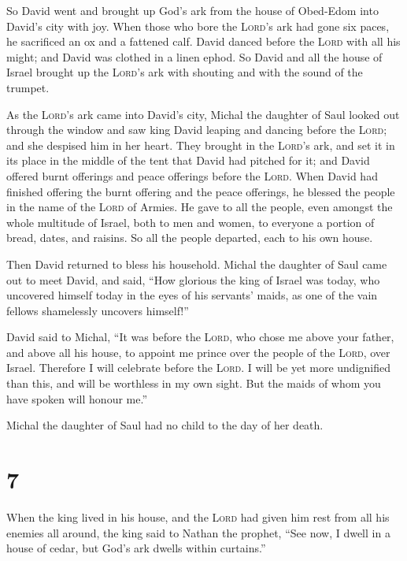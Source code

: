 So David went and brought up God's ark from the house of Obed-Edom into
David's city with joy.  When those who bore the
\textsc{Lord}'s ark had gone six paces, he sacrificed an ox and a
fattened calf.  David danced before the \textsc{Lord}
with all his might; and David was clothed in a linen ephod.
 So David and all the house of Israel brought up the
\textsc{Lord}'s ark with shouting and with the sound of the trumpet.

 As the \textsc{Lord}'s ark came into David's city,
Michal the daughter of Saul looked out through the window and saw king
David leaping and dancing before the \textsc{Lord}; and she despised him
in her heart.  They brought in the \textsc{Lord}'s ark,
and set it in its place in the middle of the tent that David had pitched
for it; and David offered burnt offerings and peace offerings before the
\textsc{Lord}.  When David had finished offering the
burnt offering and the peace offerings, he blessed the people in the
name of the \textsc{Lord} of Armies.  He gave to all the
people, even amongst the whole multitude of Israel, both to men and
women, to everyone a portion of bread, dates, and raisins. So all the
people departed, each to his own house.

 Then David returned to bless his household. Michal the
daughter of Saul came out to meet David, and said, ``How glorious the
king of Israel was today, who uncovered himself today in the eyes of his
servants' maids, as one of the vain fellows shamelessly uncovers
himself!''

 David said to Michal, ``It was before the \textsc{Lord},
who chose me above your father, and above all his house, to appoint me
prince over the people of the \textsc{Lord}, over Israel. Therefore I
will celebrate before the \textsc{Lord}.  I will be yet
more undignified than this, and will be worthless in my own sight. But
the maids of whom you have spoken will honour me.''

 Michal the daughter of Saul had no child to the day of
her death.

\hypertarget{section-6}{%
\section{7}\label{section-6}}

 When the king lived in his house, and the \textsc{Lord}
had given him rest from all his enemies all around,  the
king said to Nathan the prophet, ``See now, I dwell in a house of cedar,
but God's ark dwells within curtains.''

